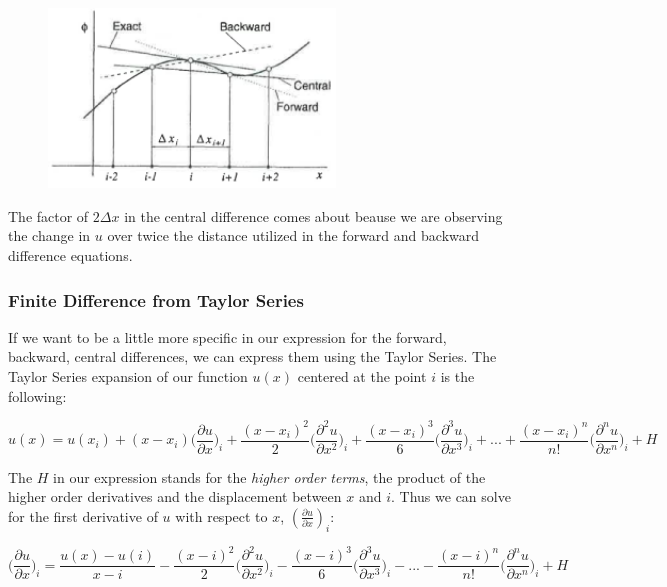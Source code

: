 \documentclass[twocolumn,12pth]{article}
\begin{document}
\begin{figure}
\centering
\includegraphics[width=3.0in]{finiteDif.png}
\label{fig:difs}
\end{figure}

The factor of $2\Delta{x}$ in the central difference comes about beause we are observing the change in $u$ over twice the distance utilized in the forward and backward difference equations.

\subsubsection{Finite Difference from Taylor Series}
If we want to be a little more specific in our expression for the forward, backward, central differences, we can express them using the Taylor Series.
The Taylor Series expansion of our function $u(x)$ centered at the point $i$ is the following:

\begin{equation}
u(x) = u(x_i) + (x-x_i)\bigg(\frac{\partial{u}}{\partial{x}}\bigg)_i + \frac{(x-x_i)^2}{2}\bigg(\frac{\partial^2{u}}{\partial{x^2}}\bigg)_i + \frac{(x-x_i)^3}{6}\bigg(\frac{\partial^3{u}}{\partial{x^3}}\bigg)_i + ... + \frac{(x-x_i)^n}{n!}\bigg(\frac{\partial^n{u}}{\partial{x^n}}\bigg)_i + H 
\end{equation}

The $H$ in our expression stands for the \textit{higher order terms}, the product of the higher order derivatives and the displacement between $x$ and $i$.
Thus we can solve for the first derivative of $u$ with respect to $x$, $(\frac{\partial{u}}{\partial{x}})_i$:

\begin{equation}
\bigg(\frac{\partial{u}}{\partial{x}}\bigg)_i = \frac{u(x) - u(i)}{x-i}
- \frac{(x-i)^2}{2}\bigg(\frac{\partial^2{u}}{\partial{x^2}}\bigg)_i - \frac{(x-i)^3}{6}\bigg(\frac{\partial^3{u}}{\partial{x^3}}\bigg)_i - ... - \frac{(x-i)^n}{n!}\bigg(\frac{\partial^n{u}}{\partial{x^n}}\bigg)_i + H 
\end{equation}
\end{document}
